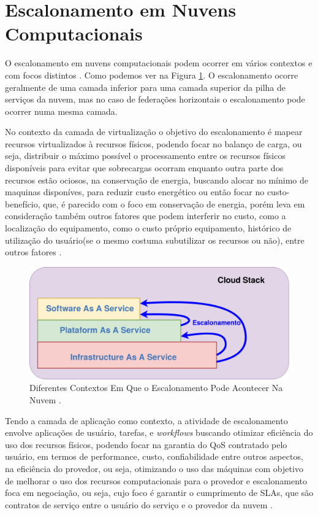 \section{Escalonamento em Nuvens Computacionais}
O escalonamento em nuvens computacionais podem ocorrer em vários contextos e com focos distintos \cite{Zhan:2015:CCR:2775083.2788397}. Como podemos ver na Figura \ref{EscalonamentoStack}. O escalonamento ocorre geralmente de uma camada inferior para uma camada superior da pilha de serviços da nuvem, mas no caso de federações horizontais o escalonamento pode ocorrer numa mesma camada. 

No contexto da camada de virtualização o objetivo do escalonamento é mapear recursos virtualizados à recursos físicos, podendo focar no balanço de carga, ou seja, distribuir o máximo possível o processamento entre os recursos físicos disponíveis para evitar que sobrecargas ocorram enquanto outra parte dos recursos estão ociosos, na conservação de energia, buscando alocar no mínimo de maquinas disponíves, para reduzir custo energético ou então focar no custo-benefício, que, é parecido com o foco em conservação de energia, porém leva em consideração também outros fatores que podem interferir no custo, como a localização do equipamento, como o custo próprio equipamento, histórico de utilização do usuário(se o mesmo costuma subutilizar os recursos ou não), entre outros fatores \cite{Zhan:2015:CCR:2775083.2788397}.

\begin{figure}[htbp]
	\centerline{\includegraphics[width=15.0cm]{img/EscalonamentoStack.png}}
	\caption{Diferentes Contextos Em Que o Escalonamento Pode Acontecer Na Nuvem \cite{Zhan:2015:CCR:2775083.2788397}.}
	\label{EscalonamentoStack}
\end{figure}

Tendo a camada de aplicação como contexto, a atividade de escalonamento envolve aplicações de usuário, tarefas, e \textit{workflows} buscando otimizar eficiência do uso dos recursos físicos, podendo focar na garantia do \acrfull{QoS} contratado pelo usuário, em termos de performance, custo, confiabilidade entre outros aspectos, na eficiência do provedor, ou seja, otimizando o uso das máquinas com objetivo de melhorar o uso dos recursos computacionais para o provedor e escalonamento foca em negociação, ou seja, cujo foco é garantir o cumprimento de \acrfull{SLA}s, que são contratos de serviço entre o usuário do serviço e o provedor da nuvem \cite{Zhan:2015:CCR:2775083.2788397}.

